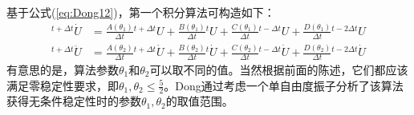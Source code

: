 基于公式(\ref{eq:Dong12})，第一个积分算法可构造如下：
\begin{align}
{^{t+\Delta t}\!\dot{U}}&=\frac{A(\theta_1)}{\Delta t}{^{t+\Delta t}\!U}+\frac{B(\theta_1)}{\Delta t}{^{t}\!U}+\frac{C(\theta_1)}{\Delta t}{^{t-\Delta t}\!U}+\frac{D(\theta_1)}{\Delta t}{^{t-2\Delta t}\!U}\\
{^{t+\Delta t}\!\ddot{U}}&=\frac{A(\theta_2)}{\Delta t}{^{t+\Delta t}\!\dot{U}}+\frac{B(\theta_2)}{\Delta t}{^{t}\!\dot{U}}+\frac{C(\theta_2)}{\Delta t}{^{t-\Delta t}\!\dot{U}}+\frac{D(\theta_2)}{\Delta t}{^{t-2\Delta t}\!\dot{U}}
\end{align}
有意思的是，算法参数$\theta_1$和$\theta_2$可以取不同的值。当然根据前面的陈述，它们都应该满足零稳定性要求，即$\theta_1,\theta_2\le\frac{5}{2}$。Dong通过考虑一个单自由度振子分析了该算法获得无条件稳定性时的参数$\theta_1,\theta_2$的取值范围。


